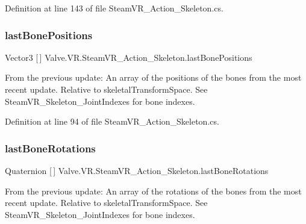 Definition at line 143 of file Steam\+V\+R\+\_\+\+Action\+\_\+\+Skeleton.\+cs.

\mbox{\label{class_valve_1_1_v_r_1_1_steam_v_r___action___skeleton_aff8d8bd91c2273d645d3e15ab40346d3}} 
\subsubsection{\texorpdfstring{lastBonePositions}{lastBonePositions}}
{\footnotesize\ttfamily Vector3 \mbox{[}$\,$\mbox{]} Valve.\+V\+R.\+Steam\+V\+R\+\_\+\+Action\+\_\+\+Skeleton.\+last\+Bone\+Positions\hspace{0.3cm}{\ttfamily [get]}}



From the previous update\+: An array of the positions of the bones from the most recent update. Relative to skeletal\+Transform\+Space. See Steam\+V\+R\+\_\+\+Skeleton\+\_\+\+Joint\+Indexes for bone indexes. 



Definition at line 94 of file Steam\+V\+R\+\_\+\+Action\+\_\+\+Skeleton.\+cs.

\mbox{\label{class_valve_1_1_v_r_1_1_steam_v_r___action___skeleton_a58a7bac7e74072d967ac07c936ec58f3}} 
\subsubsection{\texorpdfstring{lastBoneRotations}{lastBoneRotations}}
{\footnotesize\ttfamily Quaternion \mbox{[}$\,$\mbox{]} Valve.\+V\+R.\+Steam\+V\+R\+\_\+\+Action\+\_\+\+Skeleton.\+last\+Bone\+Rotations\hspace{0.3cm}{\ttfamily [get]}}



From the previous update\+: An array of the rotations of the bones from the most recent update. Relative to skeletal\+Transform\+Space. See Steam\+V\+R\+\_\+\+Skeleton\+\_\+\+Joint\+Indexes for bone indexes. 



